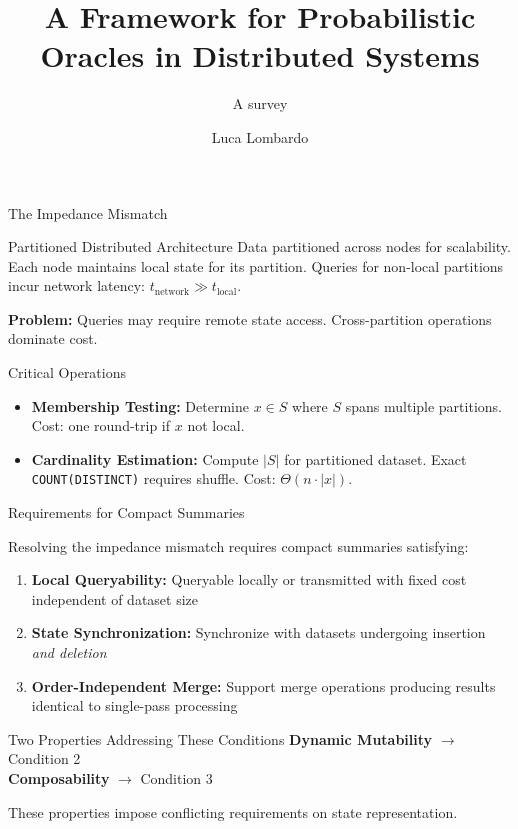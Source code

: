 \documentclass{beamer}
\title{A Framework for Probabilistic Oracles in Distributed Systems}
\subtitle{A survey}
\author{Luca Lombardo}
\date{}
\begin{document}
\maketitle

\begin{frame}{The Impedance Mismatch}

    \begin{block}{Partitioned Distributed Architecture}
        Data partitioned across nodes for scalability.
        Each node maintains local state for its partition.
        Queries for non-local partitions incur network latency: $t_{\text{network}} \gg t_{\text{local}}$.
    \end{block}

    \textbf{Problem:} Queries may require remote state access.
    Cross-partition operations dominate cost.

    \begin{block}{Critical Operations}
        \begin{itemize}
            \item \textbf{Membership Testing:} Determine $x \in S$ where $S$ spans multiple partitions. Cost: one round-trip if $x$ not local.

            \item \textbf{Cardinality Estimation:} Compute $|S|$ for partitioned dataset. Exact \texttt{COUNT(DISTINCT)} requires shuffle. Cost: $\Theta(n \cdot |x|)$.
        \end{itemize}
    \end{block}

\end{frame}

\begin{frame}{Requirements for Compact Summaries}

    Resolving the impedance mismatch requires compact summaries satisfying:

    \begin{enumerate}
        \item \textbf{Local Queryability:} Queryable locally or transmitted
              with fixed cost independent of dataset size
        \item \textbf{State Synchronization:} Synchronize with datasets
              undergoing insertion \emph{and deletion}
        \item \textbf{Order-Independent Merge:} Support merge operations
              producing results identical to single-pass processing
    \end{enumerate}


    \begin{block}{Two Properties Addressing These Conditions}
        \textbf{Dynamic Mutability} $\to$ Condition 2 \\
        \textbf{Composability} $\to$ Condition 3
    \end{block}

    These properties impose conflicting requirements on state representation.

\end{frame}
\end{document}
